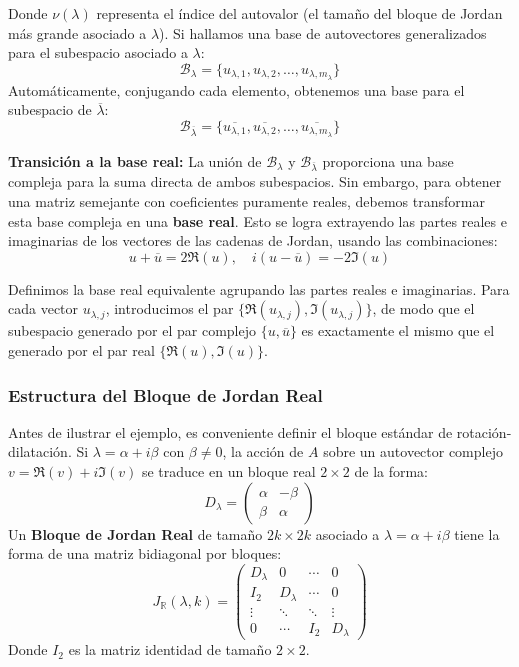 Donde $\nu(\lambda)$ representa el índice del autovalor (el tamaño del bloque de Jordan más grande asociado a $\lambda$). Si hallamos una base de autovectores generalizados para el subespacio asociado a $\lambda$:
$$ \mathcal{B}_\lambda = \{u_{\lambda,1}, u_{\lambda,2}, \dots, u_{\lambda,m_{\lambda}}\} $$
Automáticamente, conjugando cada elemento, obtenemos una base para el subespacio de $\overline{\lambda}$:
$$ \mathcal{B}_{\overline{\lambda}} = \{\overline{u_{\lambda,1}}, \overline{u_{\lambda,2}}, \dots, \overline{u_{\lambda,m_{\lambda}}}\} $$

\textbf{Transición a la base real:} La unión de $\mathcal{B}_\lambda$ y $\mathcal{B}_{\overline{\lambda}}$ proporciona una base compleja para la suma directa de ambos subespacios. Sin embargo, para obtener una matriz semejante con coeficientes puramente reales, debemos transformar esta base compleja en una \textbf{base real}. Esto se logra extrayendo las partes reales e imaginarias de los vectores de las cadenas de Jordan, usando las combinaciones:
$$ u + \overline{u} = 2\Re(u), \quad i(u - \overline{u}) = -2\Im(u) $$

Definimos la base real equivalente agrupando las partes reales e imaginarias. Para cada vector $u_{\lambda, j}$, introducimos el par $\{\Re(u_{\lambda, j}), \Im(u_{\lambda, j})\}$, de modo que el subespacio generado por el par complejo $\{u, \overline{u}\}$ es exactamente el mismo que el generado por el par real $\{\Re(u), \Im(u)\}$.

\subsubsection{Estructura del Bloque de Jordan Real}

Antes de ilustrar el ejemplo, es conveniente definir el bloque estándar de rotación-dilatación. Si $\lambda = \alpha + i\beta$ con $\beta \neq 0$, la acción de $A$ sobre un autovector complejo $v = \Re(v) + i\Im(v)$ se traduce en un bloque real $2 \times 2$ de la forma:
$$ D_{\lambda} = \begin{pmatrix} \alpha & -\beta \\ \beta & \alpha \end{pmatrix} $$
Un \textbf{Bloque de Jordan Real} de tamaño $2k \times 2k$ asociado a $\lambda = \alpha + i\beta$ tiene la forma de una matriz bidiagonal por bloques:
$$ J_{\mathbb{R}}(\lambda, k) = \begin{pmatrix}
D_{\lambda} & 0 & \cdots & 0 \\
I_2 & D_{\lambda} & \cdots & 0 \\
\vdots & \ddots & \ddots & \vdots \\
0 & \cdots & I_2 & D_{\lambda}
\end{pmatrix} $$
Donde $I_2$ es la matriz identidad de tamaño $2 \times 2$.

